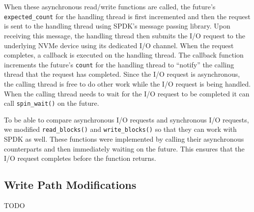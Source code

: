 When these asynchronous read/write functions are called, the future's {\tt
expected\_count} for the handling thread is first incremented and then the
request is sent to the handling thread using SPDK's message passing library.
Upon receiving this message, the handling thread then submits the I/O request
to the underlying NVMe device using its dedicated I/O channel. When the request
completes, a callback is executed on the handling thread. The callback function
increments the future's {\tt count} for the handling thread to ``notify'' the
calling thread that the request has completed. Since the I/O request is
asynchronous, the calling thread is free to do other work while the I/O request
is being handled. When the calling thread needs to wait for the I/O request to
be completed it can call {\tt spin\_wait()} on the future.

To be able to compare asynchronous I/O requests and synchronous I/O
requests, we modified {\tt read\_blocks()} and {\tt write\_blocks()} so that
they can work with SPDK as well. These functions were implemented by calling
their asynchronous counterparts and then immediately waiting on the future.
This ensures that the I/O request completes before the function returns.

\subsection{Write Path Modifications}
TODO
